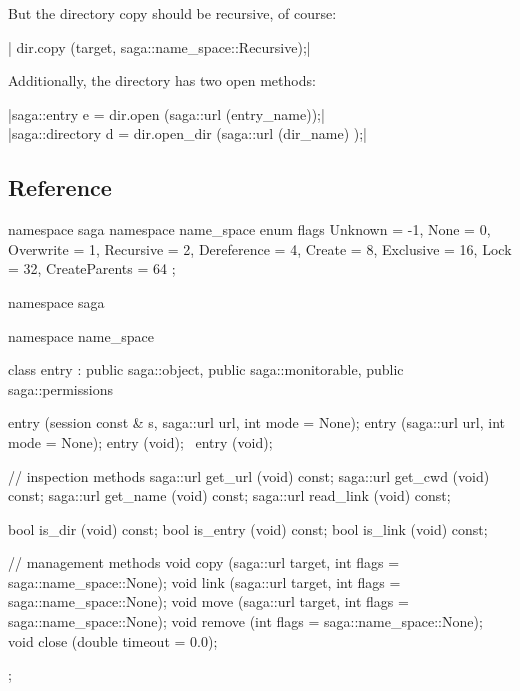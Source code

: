   But the directory copy should be recursive, of course:

  \shift |  dir.copy (target, saga::name_space::Recursive);|

  Additionally, the directory has two open methods:
  
  \shift |saga::entry     e = dir.open     (saga::url (entry_name));|\\
  \shift |saga::directory d = dir.open_dir (saga::url (dir_name)  );|


 \subsection{Reference}
 
  \begin{mycode}[label=Prototype: saga::namespace::flags]
   namespace saga
   {
     namespace name_space 
     {
       enum flags
       {
         Unknown         =  -1,
         None            =   0,
         Overwrite       =   1, 
         Recursive       =   2,
         Dereference     =   4,
         Create          =   8,
         Exclusive       =  16,
         Lock            =  32,
         CreateParents   =  64
       };
    }
  }
  \end{mycode}
 
 
  \begin{mycode}[label=Prototype: saga::namespace::entry]
   namespace saga
   {
     namespace name_space 
     {
       class entry
           : public saga::object,
             public saga::monitorable,
             public saga::permissions
       {
         entry  (session const & s, 
                 saga::url       url, 
                 int             mode = None);
         entry  (saga::url       url, 
                 int             mode = None);
         entry  (void);
         ~entry (void);
   
         // inspection methods
         saga::url get_url   (void) const;
         saga::url get_cwd   (void) const;
         saga::url get_name  (void) const;
         saga::url read_link (void) const;
 
         bool      is_dir    (void) const;
         bool      is_entry  (void) const;
         bool      is_link   (void) const;
 
         // management methods
         void      copy      (saga::url target, 
                              int flags = saga::name_space::None);
         void      link      (saga::url target, 
                              int flags = saga::name_space::None);
         void      move      (saga::url target, 
                              int flags = saga::name_space::None);
         void      remove    (int flags = saga::name_space::None);
         void      close     (double timeout = 0.0);
       };
     }
   } 
 
 \end{mycode}
 
